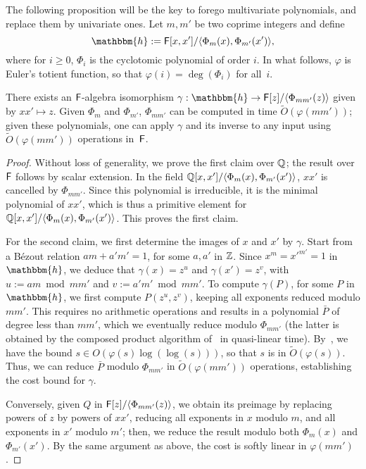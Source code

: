 The following proposition will be the key to forego multivariate
polynomials, and replace them by univariate ones.  Let $m,m'$ be two
coprime integers and define
$$\mathbbm{h}:=\F[x,x']/\langle \Phi_{m}(x), \Phi_{m'}(x')\rangle,$$
where for $i \ge 0$, $\Phi_i$ is the cyclotomic polynomial of order
$i$. In what follows, $\varphi$ is Euler's totient function, so that
$\varphi(i) = \deg(\Phi_i)$ for all~$i$.
\begin{lemma}
  There exists an ${\mathsf{F}}$-algebra isomorphism $\gamma: \mathbbm{h} \to
  \F[z]/\langle\Phi_{mm'}(z)\rangle$ given by $xx' \mapsto z$.  Given
  $\Phi_m$ and $\Phi_{m'}$, $\Phi_{mm'}$ can be computed in time
  $\tilde{O}(\varphi(mm'))$; given these polynomials, one can
  apply $\gamma$ and its inverse to any input using
  $\tilde{O}(\varphi(mm'))$ operations in~${\mathsf{F}}$.
\end{lemma}
\begin{proof}
  Without loss of generality, we prove the first claim over $\mathbb{Q}$; the
  result over ${\mathsf{F}}$ follows by scalar extension. In the field \sloppy
  $\mathbb{Q}[x,x']/\langle \Phi_{m}(x), \Phi_{m'}(x')\rangle$, $xx'$ is
  cancelled by $\Phi_{mm'}$. Since this polynomial is irreducible, it
  is the minimal polynomial of $xx'$, which is thus a primitive
  element for $\mathbb{Q}[x,x']/\langle \Phi_{m}(x),
  \Phi_{m'}(x')\rangle$. This proves the first claim.

  For the second claim, we first determine the images of $x$ and $x'$
  by $\gamma$. Start from a B\'ezout relation $am+ a'm'=1$, for some
  $a,a'$ in $\mathbb{Z}$.  Since $x^m = {x'}^{m'}=1$ in $\mathbbm{h}$, we
  deduce that $\gamma(x)=z^{u}$ and $\gamma(x') = z^{v}$, with $u:=am
  \bmod mm'$ and $v:=a'm' \bmod mm'$. To compute $\gamma(P)$, for some
  $P$ in $\mathbbm{h}$, we first compute $P(z^u, z^v)$, keeping all
  exponents reduced modulo $mm'$. This requires no arithmetic
  operations and results in a polynomial $\bar P$ of degree less than
  $mm'$, which we eventually reduce modulo $\Phi_{mm'}$ (the latter is
  obtained by the composed product algorithm of~\cite{BoFlSaSc06} in
  quasi-linear time).  By~\cite[Theorem~8.8.7]{BacSha96}, we have the
  bound $s \in O(\varphi(s) \log(\log(s)))$, so that $s$ is in
  $\tilde{O}(\varphi(s))$. Thus, we can reduce $\bar P$ modulo
  $\Phi_{mm'}$ in $\tilde{O}(\varphi(mm'))$ operations, establishing
  the cost bound for $\gamma$.

Conversely, given $Q$ in ${\mathsf{F}}[z]/\langle\Phi_{mm'}(z)\rangle$, we
obtain its preimage by replacing powers of $z$ by powers of $xx'$,
reducing all exponents in $x$ modulo $m$, and all exponents in $x'$
modulo $m'$; then, we reduce the result modulo both $\Phi_m(x)$ and
$\Phi_{m'}(x')$.  By the same argument as above, the cost is softly
linear in $\varphi(mm')$.
\end{proof}

